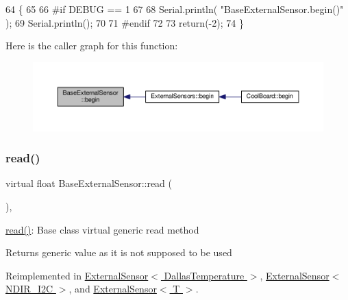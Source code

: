 \begin{DoxyCode}
64     \{
65     
66 \textcolor{preprocessor}{    #if DEBUG == 1 }
67     
68         Serial.println( \textcolor{stringliteral}{"BaseExternalSensor.begin()"} );
69         Serial.println();
70     
71 \textcolor{preprocessor}{    #endif}
72 
73         \textcolor{keywordflow}{return}(-2);
74     \}
\end{DoxyCode}
Here is the caller graph for this function\+:\nopagebreak
\begin{figure}[H]
\begin{center}
\leavevmode
\includegraphics[width=350pt]{classBaseExternalSensor_a87d132803d4f4fdd4e66332809f0c9a0_icgraph}
\end{center}
\end{figure}
\mbox{\label{classBaseExternalSensor_a1564f16deacf57b51b9948ac29db4291}} 
\subsubsection{\texorpdfstring{read()}{read()}}
{\footnotesize\ttfamily virtual float Base\+External\+Sensor\+::read (\begin{DoxyParamCaption}{ }\end{DoxyParamCaption})\hspace{0.3cm}{\ttfamily [inline]}, {\ttfamily [virtual]}}

\hyperlink{classBaseExternalSensor_a1564f16deacf57b51b9948ac29db4291}{read()}\+: Base class virtual generic read method

\begin{DoxyReturn}{Returns}
generic value as it is not supposed to be used 
\end{DoxyReturn}


Reimplemented in \hyperlink{classExternalSensor_3_01DallasTemperature_01_4_a1e725d9338314515d4e5dc456ed6a6c8}{External\+Sensor$<$ Dallas\+Temperature $>$}, \hyperlink{classExternalSensor_3_01NDIR__I2C_01_4_a239d18652e9fb4673842ae9726edf44f}{External\+Sensor$<$ N\+D\+I\+R\+\_\+\+I2\+C $>$}, and \hyperlink{classExternalSensor_a5fb3afc7d244fb86dac68ab5481bc407}{External\+Sensor$<$ T $>$}.



